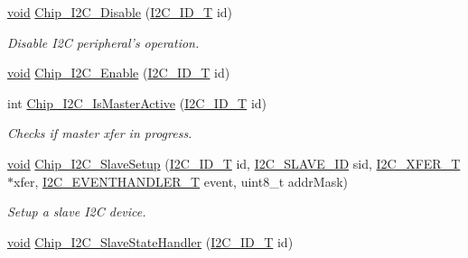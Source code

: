 \begin{DoxyCompactItemize}
\hyperlink{Paradigm_2Tern__EE_2small_2portmacro_8h_a14d32f8130d3c0b212cfc751730b5b49}{void} \hyperlink{group__I2C__17XX__40XX_ga68f1d630224edab35ba796373c5867c0}{Chip\-\_\-\-I2\-C\-\_\-\-Disable} (\hyperlink{group__I2C__17XX__40XX_ga957556a4d900506cd4cba8427afd81e6}{I2\-C\-\_\-\-I\-D\-\_\-\-T} id)
\begin{DoxyCompactList}\small\item\em Disable I2\-C peripheral's operation. \end{DoxyCompactList}\item 
\hyperlink{Paradigm_2Tern__EE_2small_2portmacro_8h_a14d32f8130d3c0b212cfc751730b5b49}{void} \hyperlink{group__I2C__17XX__40XX_ga8b8a2adad5377021eb1a15b815abc3f6}{Chip\-\_\-\-I2\-C\-\_\-\-Enable} (\hyperlink{group__I2C__17XX__40XX_ga957556a4d900506cd4cba8427afd81e6}{I2\-C\-\_\-\-I\-D\-\_\-\-T} id)
\item 
int \hyperlink{group__I2C__17XX__40XX_ga5fdf29aff7847c93373cf02da41285e1}{Chip\-\_\-\-I2\-C\-\_\-\-Is\-Master\-Active} (\hyperlink{group__I2C__17XX__40XX_ga957556a4d900506cd4cba8427afd81e6}{I2\-C\-\_\-\-I\-D\-\_\-\-T} id)
\begin{DoxyCompactList}\small\item\em Checks if master xfer in progress. \end{DoxyCompactList}\item 
\hyperlink{Paradigm_2Tern__EE_2small_2portmacro_8h_a14d32f8130d3c0b212cfc751730b5b49}{void} \hyperlink{group__I2C__17XX__40XX_gaf6ea40668dde26e406f76ff3ddeda527}{Chip\-\_\-\-I2\-C\-\_\-\-Slave\-Setup} (\hyperlink{group__I2C__17XX__40XX_ga957556a4d900506cd4cba8427afd81e6}{I2\-C\-\_\-\-I\-D\-\_\-\-T} id, \hyperlink{group__I2C__17XX__40XX_ga5fb1ba338fb3822bb6ca012adc4194bf}{I2\-C\-\_\-\-S\-L\-A\-V\-E\-\_\-\-I\-D} sid, \hyperlink{structI2C__XFER__T}{I2\-C\-\_\-\-X\-F\-E\-R\-\_\-\-T} $\ast$xfer, \hyperlink{group__I2C__17XX__40XX_ga932bfc2f55180a71b93427e88b6223e6}{I2\-C\-\_\-\-E\-V\-E\-N\-T\-H\-A\-N\-D\-L\-E\-R\-\_\-\-T} event, uint8\-\_\-t addr\-Mask)
\begin{DoxyCompactList}\small\item\em Setup a slave I2\-C device. \end{DoxyCompactList}\item 
\hyperlink{Paradigm_2Tern__EE_2small_2portmacro_8h_a14d32f8130d3c0b212cfc751730b5b49}{void} \hyperlink{group__I2C__17XX__40XX_ga650618a5f4717c46ae3ea304142ddc03}{Chip\-\_\-\-I2\-C\-\_\-\-Slave\-State\-Handler} (\hyperlink{group__I2C__17XX__40XX_ga957556a4d900506cd4cba8427afd81e6}{I2\-C\-\_\-\-I\-D\-\_\-\-T} id)

\end{DoxyCompactItemize}
